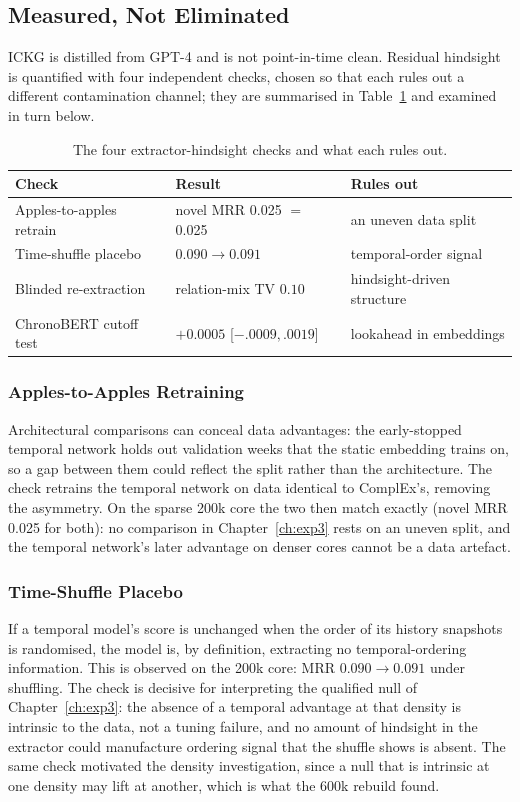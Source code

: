 \documentclass[a4paper,12pt]{report}
\begin{document}
\subsection{Measured, Not Eliminated}
ICKG is distilled from GPT-4 and is not point-in-time clean. Residual
hindsight is quantified with four independent checks, chosen so that each
rules out a different contamination channel; they are summarised in
Table~\ref{tab:pitchecks} and examined in turn below.

\begin{table}[ht]
\centering
\caption{The four extractor-hindsight checks and what each rules out.}
\label{tab:pitchecks}
\begin{tabular}{lll}
\toprule
Check & Result & Rules out \\
\midrule
Apples-to-apples retrain & novel MRR 0.025 $=$ 0.025 & an uneven data split \\
Time-shuffle placebo & $0.090 \rightarrow 0.091$ & temporal-order signal \\
Blinded re-extraction & relation-mix TV $0.10$ & hindsight-driven structure \\
ChronoBERT cutoff test & $+0.0005$ [$-.0009, .0019$] & lookahead in embeddings \\
\bottomrule
\end{tabular}
\end{table}

\subsubsection{Apples-to-Apples Retraining}
Architectural comparisons can conceal data advantages: the early-stopped
temporal network holds out validation weeks that the static embedding
trains on, so a gap between them could reflect the split rather than the
architecture. The check retrains the temporal network on data identical to
ComplEx's, removing the asymmetry. On the sparse 200k core the two then
match exactly (novel MRR 0.025 for both): no comparison in
Chapter~\ref{ch:exp3} rests on an uneven split, and the temporal network's
later advantage on denser cores cannot be a data artefact.

\subsubsection{Time-Shuffle Placebo}
If a temporal model's score is unchanged when the order of its history
snapshots is randomised, the model is, by definition, extracting no
temporal-ordering information. This is observed on the 200k core: MRR
$0.090 \rightarrow 0.091$ under shuffling. The check is decisive for
interpreting the qualified null of Chapter~\ref{ch:exp3}: the absence of a
temporal advantage at that density is intrinsic to the data, not a tuning
failure, and no amount of hindsight in the extractor could manufacture
ordering signal that the shuffle shows is absent. The same check motivated
the density investigation, since a null that is intrinsic at one density
may lift at another, which is what the 600k rebuild found.
\end{document}
